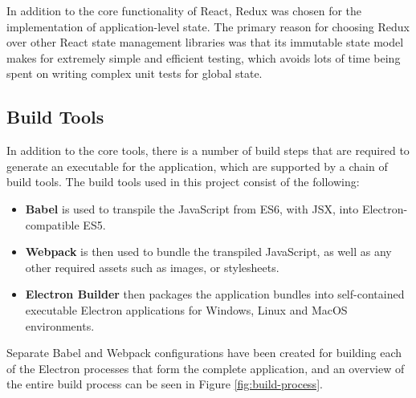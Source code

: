 In addition to the core functionality of React, Redux was chosen for the implementation of application-level state. The primary reason for choosing Redux over other React state management libraries was that its immutable state model makes for extremely simple and efficient testing, which avoids lots of time being spent on writing complex unit tests for global state.

\subsection{Build Tools}
In addition to the core tools, there is a number of build steps that are required to generate an executable for the application, which are supported by a chain of build tools. The build tools used in this project consist of the following:

\begin{itemize}
  \item \textbf{Babel} is used to transpile the JavaScript from ES6, with JSX, into Electron-compatible ES5.
  \item \textbf{Webpack} is then used to bundle the transpiled JavaScript, as well as any other required assets such as images, or stylesheets.
  \item \textbf{Electron Builder} then packages the application bundles into self-contained executable Electron applications for Windows, Linux and MacOS environments.
\end{itemize}

Separate Babel and Webpack configurations have been created for building each of the Electron processes that form the complete application, and an overview of the entire build process can be seen in Figure \ref{fig:build-process}.

